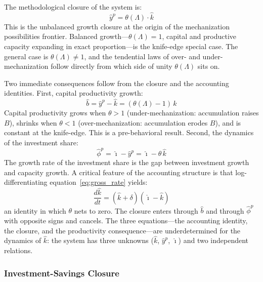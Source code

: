 \documentclass[11pt,a4paper]{article}
\begin{document}
The methodological closure of the system is:
%
\begin{equation}\label{eq:closure}
	\hat{y}^p = \theta(\Lambda) \cdot \hat{k}
\end{equation}
%
This is the unbalanced growth closure at the origin of the mechanization possibilities frontier. Balanced growth---$\theta(\Lambda) = 1$, capital and productive capacity expanding in exact proportion---is the knife-edge special case. The general case is $\theta(\Lambda) \neq 1$, and the tendential laws of over- and under-mechanization follow directly from which side of unity $\theta(\Lambda)$ sits on.

Two immediate consequences follow from the closure and the accounting identities. First, capital productivity growth:
%
\begin{equation}\label{eq:bhat}
	\hat{b} = \hat{y}^p - \hat{k} = (\theta(\Lambda) - 1)\,\hat{k}
\end{equation}
%
Capital productivity grows when $\theta > 1$ (under-mechanization: accumulation raises $B$), shrinks when $\theta < 1$ (over-mechanization: accumulation erodes $B$), and is constant at the knife-edge. This is a pre-behavioral result. Second, the dynamics of the investment share:
%
\begin{equation}\label{eq:phihat}
	\hat{\phi}^p = \hat{\imath} - \hat{y}^p = \hat{\imath} - \theta\,\hat{k}
\end{equation}
%
The growth rate of the investment share is the gap between investment growth and capacity growth. A critical feature of the accounting structure is that log-differentiating equation~\eqref{eq:gross_rate} yields:
%
\begin{equation}\label{eq:khat_accel}
	\frac{d\hat{k}}{dt} = (\hat{k} + \delta)(\hat{\imath} - \hat{k})
\end{equation}
%
an identity in which $\theta$ nets to zero. The closure enters through $\hat{b}$ and through $\hat{\phi}^p$ with opposite signs and cancels. The three equations---the accounting identity, the closure, and the productivity consequence---are underdetermined for the dynamics of $\hat{k}$: the system has three unknowns ($\hat{k}$, $\hat{y}^p$, $\hat{\imath}$) and two independent relations.



\subsubsection{Investment-Savings Closure}
\label{sec:IS_closure}
\end{document}
